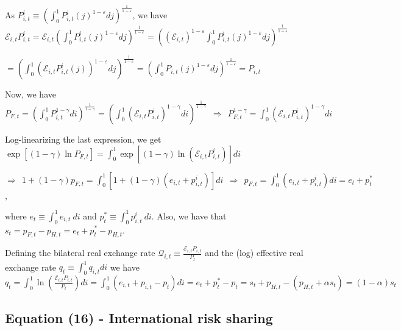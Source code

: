 \documentclass[
]{article}
\begin{document}
As
\(P_{i,t}^i \equiv \displaystyle \left( \int_0^1 P_{i,t}^i(j)^{{1-\varepsilon}}dj \right) ^{\frac{1}{1-\varepsilon}}\),
we have
\(\displaystyle \mathcal{E}_{i,t}P_{i,t}^i = \mathcal{E}_{i,t} \left( \int_0^1 P_{i,t}^i(j)^{{1-\varepsilon}}dj \right) ^{\frac{1}{1-\varepsilon}} = \left( (\mathcal{E}_{i,t})^{1-\varepsilon} \int_0^1 P_{i,t}^i(j)^{{1-\varepsilon}}dj \right) ^{\frac{1}{1-\varepsilon}}\)

\(\displaystyle = \left( \int_0^1 \left( \mathcal{E}_{i,t}P_{i,t}^i(j)\right) ^{{1-\varepsilon}}dj \right) ^{\frac{1}{1-\varepsilon}} = \left( \int_0^1 P_{i,t}(j)^{{1-\varepsilon}}dj \right) ^{\frac{1}{1-\varepsilon}} = P_{i,t}\)

Now, we have
\(\displaystyle P_{F,t}= \left( \int_0^1 P_{i,t}^{{1-\gamma}}di \right) ^{\frac{1}{1-\gamma}} = \left( \int_0^1 \left( \mathcal{E}_{i,t}P_{i,t}^i \right)^{{1-\gamma}}di \right)^{\frac{1}{1-\gamma}} \ \ \Rightarrow \ \ P_{F,t}^{1-\gamma} = \int_0^1 \left( \mathcal{E}_{i,t}P_{i,t}^i \right)^{{1-\gamma}}di\)

Log-linearizing the last expression, we get
\(\displaystyle \exp \left[(1-\gamma)\ln P_{F,t} \right] = \int_0^1 \exp \left[(1-\gamma) \ln \left( \mathcal{E}_{i,t}P_{i,t}^i \right) \right]di\)

\(\Rightarrow \ \  \displaystyle 1 + (1-\gamma)p_{F,t} = \int_0^1 \left[ 1+ (1-\gamma)(e_{i,t}+p_{i,t}^i)\right]di \ \ \Rightarrow \ \ p_{F,t} = \int_0^1 (e_{i,t}+p_{i,t}^i)di=e_t+p_t^*\),

where \(\displaystyle e_t \equiv \int_0^1 e_{i,t} \ di\) and
\(\displaystyle p_t^*\equiv \int_0^1 p_{i,t}^i \ di\). Also, we have
that \(s_t = p_{F,t}-p_{H,t}=e_t + p_t^*-p_{H,t}\).

Defining the bilateral real exchange rate
\(\displaystyle \mathcal{Q}_{i,t} \equiv \frac{\mathcal{E}_{i,t}P_{i,t}}{P_t}\)
and the (log) effective real exchange rate
\(\displaystyle q_t \equiv \int_0^1 q_{i,t}di\) we have
\(\displaystyle q_t = \int_0^1 \ln \left( \frac{\mathcal{E}_{i,t}P_{i,t}}{P_t} \right)di= \int_0^1 \left(e_{i,t}+p_{i,t}-p_t \right)di = e_t+p_t^*-p_t = s_t+p_{H,t}-(p_{H,t}+\alpha s_t) = (1-\alpha)s_t\)

\vspace{12pt}

\hypertarget{equation-16---international-risk-sharing}{%
\subsection{Equation (16) - International risk
sharing}\label{equation-16---international-risk-sharing}}
\end{document}
